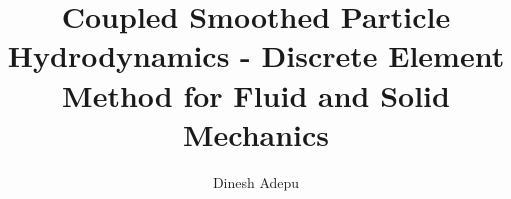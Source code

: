 \documentclass[tikz, twoside, 10pt]{iitbreport}
\newcounter{question}
\begin{document}
\newcommand\Que[1]{%
   \leavevmode\par
   \stepcounter{question}
   \noindent
   \thequestion. Q --- #1\par}

\newcommand\Ans[2][]{%
    \leavevmode\par\noindent
   {\leftskip37pt
    A --- \textbf{#1}#2\par}}

\setcounter{page}{1}

\title{Coupled Smoothed Particle Hydrodynamics - Discrete Element Method
  for Fluid and Solid Mechanics}
\author{Dinesh Adepu}












\maketitle

\end{document}
